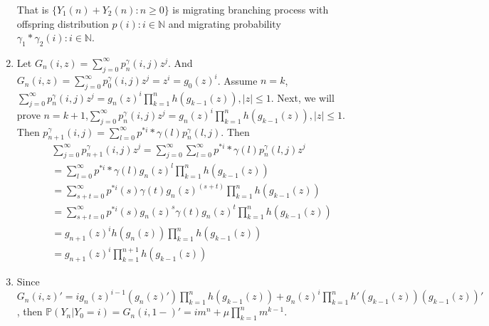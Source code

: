 \documentclass{ctexart}
\begin{document}
\begin{enumerate}
    That is \(\{Y_1(n )+ Y_2(n): n \geq 0\}\) is migrating branching process with offspring distribution \(p(i): i \in \mathbb{N}\)
    and migrating probability \(\gamma_1 * \gamma_2(i): i \in \mathbb{N}\).
  \item Let \(G_n(i,z)=\sum_{j=0}^{\infty} p_n^\gamma(i,j)z^j\). And \(G_n(i,z)=\sum_{j=0}^{\infty} p_0^\gamma(i,j)z^j=z^i=g_0(z)^i\).
    Assume \(n=k\),\(        \sum_{j=0}^{\infty} p_n^\gamma(i,j)z^j = g_n(z)^i \prod_{k=1}^{n} h(g_{k-1}(z)), |z| \leq 1\). Next, we will
    prove \(n=k + 1\),\(        \sum_{j=0}^{\infty} p_n^\gamma(i,j)z^j = g_n(z)^i \prod_{k=1}^{n} h(g_{k-1}(z)), |z| \leq 1\).
    Then \(p_{n + 1}^\gamma(i,j)=\sum_{l=0}^{\infty} p^{*i}*\gamma(l)p_n^\gamma(l,j)\).
    Then \[
      \begin{aligned}
         & \sum_{j=0}^{\infty} p_{n + 1}^\gamma(i,j)z^j = \sum_{j=0}^{\infty} \sum_{l=0}^{\infty} p^{*i}*\gamma(l)p_n^{\gamma}(l,j)z^j
        \\           & =\sum_{l=0}^{\infty} p^{*i}*\gamma(l)g_n(z)^l \prod_{k=1}^{n} h(g_{k-1}(z))
        \\           & =\sum_{s+t=0}^{\infty} p^{*i}(s)\gamma(t)g_n(z)^{(s + t)} \prod_{k=1}^{n} h(g_{k-1}(z))
        \\           & =\sum_{s+t=0}^{\infty} p^{*i}(s)g_n(z)^{s}\gamma(t)g_n(z)^t \prod_{k=1}^{n} h(g_{k-1}(z))
        \\           & =g_{n + 1}(z)^{i}h(g_n(z)) \prod_{k=1}^{n} h(g_{k-1}(z))
        \\&        =g_{n + 1}(z)^{i}\prod_{k=1}^{n + 1} h(g_{k-1}(z))
      \end{aligned}
    \]
  \item Since \(G_n(i,z)'=ig_n(z)^{i-1}(g_n(z)')\prod_{k=1}^{n}h(g_{k -1}(z)) + g_n(z)^i \prod_{k=1}^{n} h'(g_{k-1}(z))(g_{k-1}(z))' \), then
    \(\mathbb{P}(Y_n|Y_0=i)=G_n(i,1-)'=im^n + \mu \prod_{k=1}^{n} m^{k -1}\).
\end{enumerate}
\end{document}
